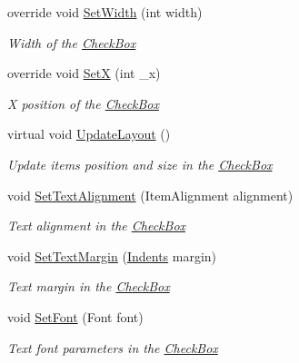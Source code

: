 \begin{DoxyCompactItemize}
override void \mbox{\hyperlink{class_space_v_i_l_1_1_check_box_abcf26de1908f7d590b768d64851e8004}{Set\+Width}} (int width)
\begin{DoxyCompactList}\small\item\em Width of the \mbox{\hyperlink{class_space_v_i_l_1_1_check_box}{Check\+Box}} \end{DoxyCompactList}\item 
override void \mbox{\hyperlink{class_space_v_i_l_1_1_check_box_a321e86a7868cb30b842988a4d607acc1}{SetX}} (int \+\_\+x)
\begin{DoxyCompactList}\small\item\em X position of the \mbox{\hyperlink{class_space_v_i_l_1_1_check_box}{Check\+Box}} \end{DoxyCompactList}\item 
virtual void \mbox{\hyperlink{class_space_v_i_l_1_1_check_box_a03402e85defa2b269c933b9000d70835}{Update\+Layout}} ()
\begin{DoxyCompactList}\small\item\em Update items position and size in the \mbox{\hyperlink{class_space_v_i_l_1_1_check_box}{Check\+Box}} \end{DoxyCompactList}\item 
void \mbox{\hyperlink{class_space_v_i_l_1_1_check_box_a71a14c9714447fe4d3c9347b920dbedb}{Set\+Text\+Alignment}} (Item\+Alignment alignment)
\begin{DoxyCompactList}\small\item\em Text alignment in the \mbox{\hyperlink{class_space_v_i_l_1_1_check_box}{Check\+Box}} \end{DoxyCompactList}\item 
void \mbox{\hyperlink{class_space_v_i_l_1_1_check_box_a17a587e2ad59ded92f7ca6968285b8de}{Set\+Text\+Margin}} (\mbox{\hyperlink{struct_space_v_i_l_1_1_decorations_1_1_indents}{Indents}} margin)
\begin{DoxyCompactList}\small\item\em Text margin in the \mbox{\hyperlink{class_space_v_i_l_1_1_check_box}{Check\+Box}} \end{DoxyCompactList}\item 
void \mbox{\hyperlink{class_space_v_i_l_1_1_check_box_aa2c476ef3b72afc85fa42a685df7535e}{Set\+Font}} (Font font)
\begin{DoxyCompactList}\small\item\em Text font parameters in the \mbox{\hyperlink{class_space_v_i_l_1_1_check_box}{Check\+Box}} \end{DoxyCompactList}\item 

\end{DoxyCompactItemize}
